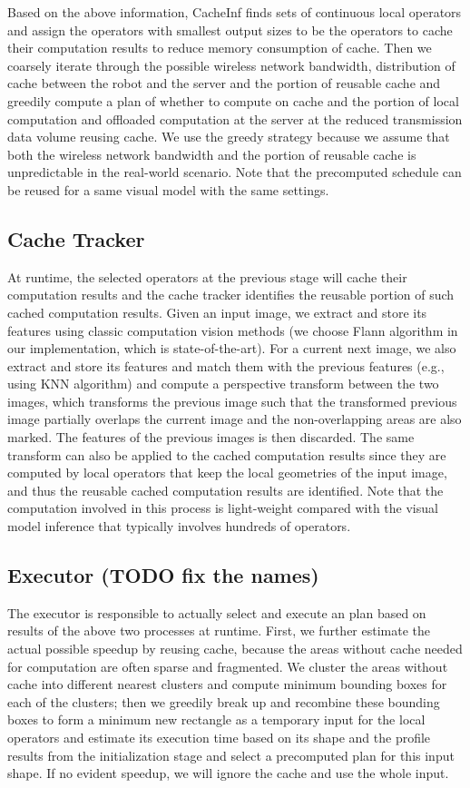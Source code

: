 Based on the above information, CacheInf finds sets of continuous local operators and assign the operators with smallest output sizes to be the operators to cache their computation results to reduce memory consumption of cache.
Then we coarsely iterate through the possible wireless network bandwidth, distribution of cache between the robot and the server and the portion of reusable cache and greedily compute a plan of whether to compute on cache and the portion of local computation and offloaded computation at the server at the reduced transmission data volume reusing cache.
We use the greedy strategy because we assume that both the wireless network bandwidth and the portion of reusable cache is unpredictable in the real-world scenario.
Note that the precomputed schedule can be reused for a same visual model with the same settings. 

\subsection{Cache Tracker}
At runtime, the selected operators at the previous stage will cache their computation results and the cache tracker identifies the reusable portion of such cached computation results.
Given an input image, we extract and store its features using classic computation vision methods (we choose Flann algorithm in our implementation, which is state-of-the-art).
For a current next image, we also extract and store its features and match them with the previous features (e.g., using KNN algorithm) and compute a perspective transform between the two images, which transforms the previous image such that the transformed previous image partially overlaps the current image and the non-overlapping areas are also marked.
The features of the previous images is then discarded.
The same transform can also be applied to the cached computation results since they are computed by local operators that keep the local geometries of the input image, and thus the reusable cached computation results are identified.
Note that the computation involved in this process is light-weight compared with the visual model inference that typically involves hundreds of operators.

\subsection{Executor (TODO fix the names)}
The executor is responsible to actually select and execute an plan based on results of the above two processes at runtime.
First, we further estimate the actual possible speedup by reusing cache, because the areas without cache needed for computation are often sparse and fragmented.
We cluster the areas without cache into different nearest clusters and compute minimum bounding boxes for each of the clusters;
then we greedily break up and recombine these bounding boxes to form a minimum new rectangle as a temporary input for the local operators and estimate its execution time based on its shape and the profile results from the initialization stage and select a precomputed plan for this input shape.
If no evident speedup, we will ignore the cache and use the whole input.

